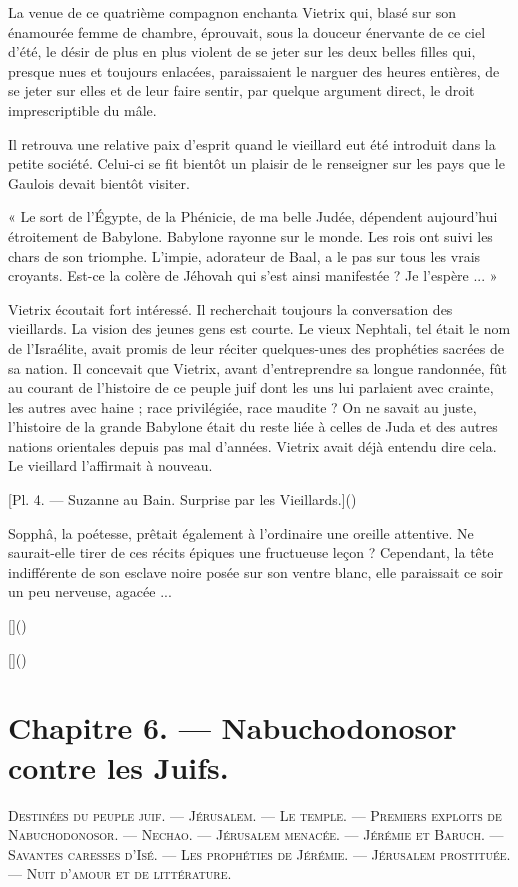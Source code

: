 \documentclass[a4paper, 11pt, oneside, polutonikogreek, french]{article}
\begin{document}
La venue de ce quatrième compagnon enchanta Vietrix qui, blasé sur son énamourée femme de chambre, éprouvait, sous la douceur énervante de ce ciel d'été, le désir de plus en plus violent de se jeter sur les deux belles filles qui, presque nues et toujours enlacées, paraissaient le narguer des heures entières, de se jeter sur elles et de leur faire sentir, par quelque argument direct, le droit imprescriptible du mâle.

\bigskip
\centerline{\EightStarTaper}
\centerline{\EightStarTaper\EightStarTaper}
\bigskip

Il retrouva une relative paix d'esprit quand le vieillard eut été introduit dans la petite société. Celui-ci se fit bientôt un plaisir de le renseigner sur les pays que le Gaulois devait bientôt visiter.

« Le sort de l'Égypte, de la Phénicie, de ma belle Judée, dépendent aujourd'hui étroitement de Babylone. Babylone rayonne sur le monde. Les rois ont suivi les chars de son triomphe. L'impie, adorateur de Baal, a le pas sur tous les vrais croyants. Est-ce la colère de Jéhovah qui s'est ainsi manifestée ? Je l'espère ... »

Vietrix écoutait fort intéressé. Il recherchait toujours la conversation des vieillards. La vision des jeunes gens est courte. Le vieux Nephtali, tel était le nom de l'Israélite, avait promis de leur réciter quelques-unes des prophéties sacrées de sa nation. Il concevait que Vietrix, avant d'entreprendre sa longue randonnée, fût au courant de l'histoire de ce peuple juif dont les uns lui parlaient avec crainte, les autres avec haine ; race privilégiée, race maudite ? On ne savait au juste, l'histoire de la grande Babylone était du reste liée à celles de Juda et des autres nations orientales depuis pas mal d'années. Vietrix avait déjà entendu dire cela. Le vieillard l'affirmait à nouveau.

[Pl. 4. --- Suzanne au Bain. Surprise par les Vieillards.]()

Sopphâ, la poétesse, prêtait également à l'ordinaire une oreille attentive. Ne saurait-elle tirer de ces récits épiques une fructueuse leçon ? Cependant, la tête indifférente de son esclave noire posée sur son ventre blanc, elle paraissait ce soir un peu nerveuse, agacée ...

[]()

[]()
\clearpage
\section{Chapitre 6. --- Nabuchodonosor contre les Juifs.}
\begin{center}
\scshape
\small
Destinées du peuple juif. --- Jérusalem. --- Le temple. --- Premiers exploits de Nabuchodonosor. --- Nechao. --- Jérusalem menacée. --- Jérémie et Baruch. --- Savantes caresses d'Isé. --- Les prophéties de Jérémie. --- Jérusalem prostituée. --- Nuit d'amour et de littérature.
\end{center}
\end{document}
